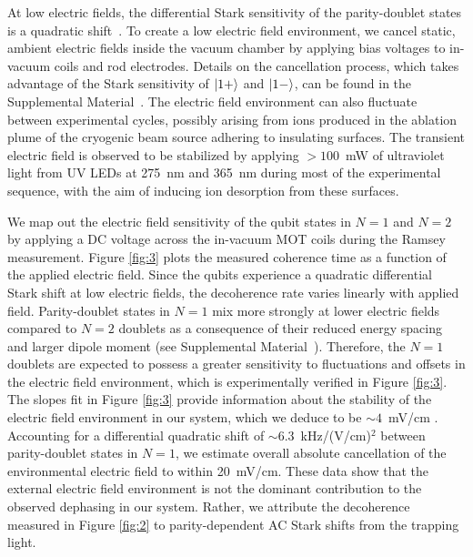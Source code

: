 \documentclass[
superscriptaddress,
twocolumn,
amsmath,amssymb,
aps,
prx,
nofootinbib,
]{revtex4-2}
\begin{document}
At low electric fields, the differential Stark sensitivity of the parity-doublet states is a quadratic shift~\cite{Supplemental}. To create a low electric field environment, we cancel static, ambient electric fields inside the vacuum chamber by applying bias voltages to in-vacuum coils and rod electrodes. Details on the cancellation process, which takes advantage of the Stark sensitivity of $\ket{1+}$ and $\ket{1-}$, can be found in the Supplemental Material~\cite{Supplemental}. The electric field environment can also fluctuate between experimental cycles, possibly arising from ions produced in the ablation plume of the cryogenic beam source adhering to insulating surfaces. The transient electric field is observed to be stabilized by applying $>$$100$~mW of ultraviolet light from UV LEDs at 275~nm and 365~nm during most of the experimental sequence, with the aim of inducing ion desorption from these surfaces.

We map out the electric field sensitivity of the qubit states in $N=1$ and $N=2$ by applying a DC voltage across the in-vacuum MOT coils during the Ramsey measurement. Figure \ref{fig:3} plots the measured coherence time as a function of the applied electric field. Since the qubits experience a quadratic differential Stark shift at low electric fields, the decoherence rate varies linearly with applied field. Parity-doublet states in $N=1$ mix more strongly at lower electric fields compared to $N=2$ doublets as a consequence of their reduced energy spacing and larger dipole moment (see Supplemental Material~\cite{Supplemental}). Therefore, the $N=1$ doublets are expected to possess a greater sensitivity to fluctuations and offsets in the electric field environment, which is experimentally verified in Figure \ref{fig:3}. The slopes fit in Figure \ref{fig:3} provide information about the stability of the electric field environment in our system, which we deduce to be $\sim$$4$~mV/cm \cite{Supplemental}. Accounting for a differential quadratic shift of $\sim$$6.3$~kHz/(V/cm)$^2$ between parity-doublet states in $N=1$, we estimate overall absolute cancellation of the environmental electric field to within 20~mV/cm. These data show that the external electric field environment is not the dominant contribution to the observed dephasing in our system. Rather, we attribute the decoherence measured in Figure \ref{fig:2} to parity-dependent AC Stark shifts from the trapping light.
\end{document}
